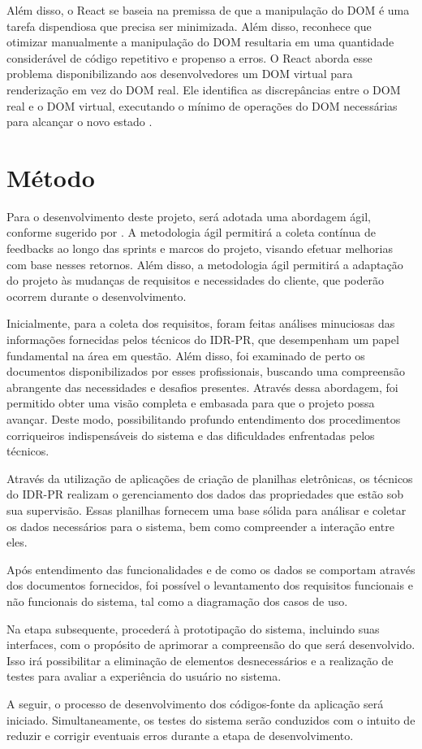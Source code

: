 Além disso, o React se baseia na premissa de que a manipulação do \gls{DOM} é uma tarefa dispendiosa que precisa ser minimizada. Além disso, reconhece que otimizar manualmente a manipulação do \gls{DOM} resultaria em uma quantidade considerável de código repetitivo e propenso a erros. O React aborda esse problema disponibilizando aos desenvolvedores um \gls{DOM} virtual para renderização em vez do \gls{DOM} real. Ele identifica as discrepâncias entre o \gls{DOM} real e o \gls{DOM} virtual, executando o mínimo de operações do \gls{DOM} necessárias para alcançar o novo estado \cite{Vipul:2016:ReactJSByExampleBuildingModernWebApplications}.

\section{Método}\label{sec:metodo}

Para o desenvolvimento deste projeto, será adotada uma abordagem ágil, conforme sugerido por . A metodologia ágil permitirá a coleta contínua de feedbacks ao longo das sprints e marcos do projeto, visando efetuar melhorias com base nesses retornos. 
Além disso, a metodologia ágil permitirá a adaptação do projeto às mudanças de requisitos e necessidades do cliente, que poderão ocorrem durante o desenvolvimento.

Inicialmente, para a coleta dos requisitos, foram feitas análises minuciosas das informações fornecidas pelos técnicos do \gls{IDR-PR}, que desempenham um papel fundamental na área em questão. Além disso, foi examinado de perto os documentos disponibilizados por esses profissionais, buscando uma compreensão abrangente das necessidades e desafios presentes. Através dessa abordagem, foi permitido obter uma visão completa e embasada para que o projeto possa avançar. Deste modo, possibilitando profundo entendimento dos procedimentos corriqueiros indispensáveis do sistema e das dificuldades enfrentadas pelos técnicos.

Através da utilização de aplicações de criação de planilhas eletrônicas, os técnicos do \gls{IDR-PR} realizam o gerenciamento dos dados das propriedades que estão sob sua supervisão. Essas planilhas fornecem uma base sólida para análisar e coletar os dados necessários para o sistema, bem como compreender a interação entre eles.

Após entendimento das funcionalidades e de como os dados se comportam através dos documentos fornecidos, foi possível o levantamento dos requisitos funcionais e não funcionais do sistema, tal como a diagramação dos casos de uso.

Na etapa subsequente, procederá à prototipação do sistema, incluindo suas interfaces, com o propósito de aprimorar a compreensão do que será desenvolvido. Isso irá possibilitar a eliminação de elementos desnecessários e a realização de testes para avaliar a experiência do usuário no sistema.

A seguir, o processo de desenvolvimento dos códigos-fonte da aplicação será iniciado. Simultaneamente, os testes do sistema serão conduzidos com o intuito de reduzir e corrigir eventuais erros durante a etapa de desenvolvimento.

